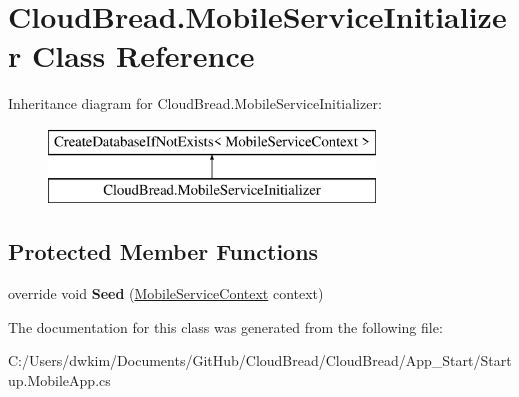 \hypertarget{class_cloud_bread_1_1_mobile_service_initializer}{}\section{Cloud\+Bread.\+Mobile\+Service\+Initializer Class Reference}
\label{class_cloud_bread_1_1_mobile_service_initializer}
Inheritance diagram for Cloud\+Bread.\+Mobile\+Service\+Initializer\+:\begin{figure}[H]
\begin{center}
\leavevmode
\includegraphics[height=2.000000cm]{class_cloud_bread_1_1_mobile_service_initializer}
\end{center}
\end{figure}
\subsection*{Protected Member Functions}
\begin{DoxyCompactItemize}
\item 
override void {\bfseries Seed} (\hyperlink{class_cloud_bread_1_1_models_1_1_mobile_service_context}{Mobile\+Service\+Context} context)\hypertarget{class_cloud_bread_1_1_mobile_service_initializer_ae60e6b723e7504c5be27b1f35b54501d}{}\label{class_cloud_bread_1_1_mobile_service_initializer_ae60e6b723e7504c5be27b1f35b54501d}

\end{DoxyCompactItemize}


The documentation for this class was generated from the following file\+:\begin{DoxyCompactItemize}
\item 
C\+:/\+Users/dwkim/\+Documents/\+Git\+Hub/\+Cloud\+Bread/\+Cloud\+Bread/\+App\+\_\+\+Start/Startup.\+Mobile\+App.\+cs\end{DoxyCompactItemize}
